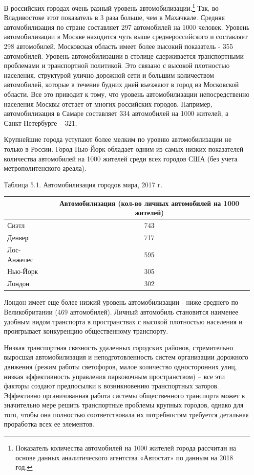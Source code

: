 \documentclass[
  11pt,
  russian,
]{book}
\begin{document}
В российских городах очень разный уровень автомобилизации.\footnote{Показатель количества автомобилей на 1000 жителей города рассчитан на
  основе данных аналитического агентства «Автостат» по данным на 2018 год.} Так, во Владивостоке этот показатель в 3 раза больше, чем в Махачкале. Средняя автомобилизация по стране составляет 297 автомобилей на 1000 человек. Уровень автомобилизации в Москве находится чуть выше среднероссийского и составляет 298 автомобилей. Московская область имеет более высокий показатель - 355 автомобилей. Уровень автомобилизации в столице сдерживается транспортными проблемами и транспортной политикой. Это связано с высокой плотностью населения, структурой улично-дорожной сети и большим количеством автомобилей, которые в течение будних дней въезжают в город из Московской области. Все это приводит к тому, что уровень автомобилизации непосредственно населения Москвы отстает от многих российских городов. Например, автомобилизация в Самаре составляет 334 автомобилей на 1000 жителей, а Санкт-Петербурге -- 321.

Крупнейшие города уступают более мелким по уровню автомобилизации не только в России. Город Нью-Йорк обладает одним из самых низких показателей количества автомобилей на 1000 жителей среди всех городов США (без учета метрополитенского ареала).

Таблица 5.1. Автомобилизация городов мира, 2017 г.

\begin{longtable}[]{@{}lc@{}}
\toprule
& Автомобилизация (кол-во личных автомобилей на 1000 жителей) \\
\midrule
\endhead
Сиэтл & 743 \\
Денвер & 717 \\
Лос-Анжелес & 595 \\
Нью-Йорк & 305 \\
Лондон & 302 \\
\bottomrule
\end{longtable}

Лондон имеет еще более низкий уровень автомобилизации - ниже среднего по Великобритании (469 автомобилей). Личный автомобиль становится наименее удобным видом транспорта в пространствах с высокой плотностью населения и проигрывает конкуренцию общественному транспорту.

Низкая транспортная связность удаленных городских районов, стремительно выросшая автомобилизация и
неподготовленность систем организации дорожного движения (режим работы светофоров, малое количество односторонних улиц, низкая эффективность управления парковочным пространством) -- все эти факторы создают предпосылки к возникновению транспортных заторов. Эффективно организованная работа системы общественного транспорта может в значительно мере решить транспортные проблемы крупных городов, однако для того, чтобы она полностью соответствовала их потребностям требуется детальная проработка всех ее элементов.
\end{document}
